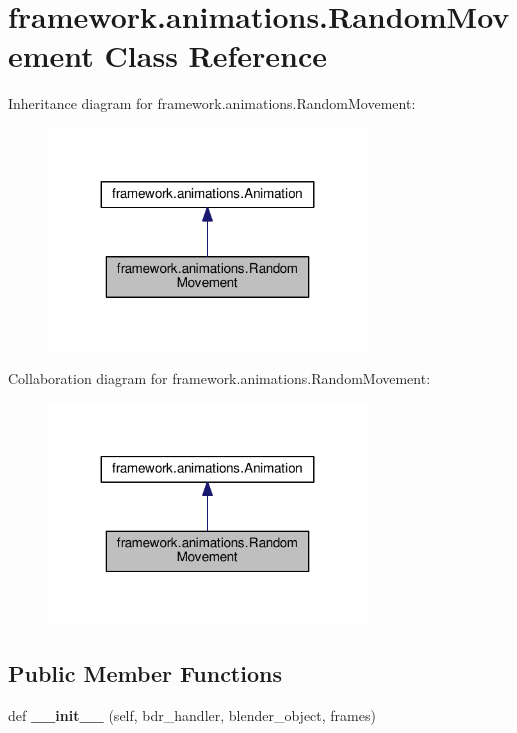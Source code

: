 \hypertarget{classframework_1_1animations_1_1RandomMovement}{}\section{framework.\+animations.\+Random\+Movement Class Reference}
\label{classframework_1_1animations_1_1RandomMovement}


Inheritance diagram for framework.\+animations.\+Random\+Movement\+:
\nopagebreak
\begin{figure}[H]
\begin{center}
\leavevmode
\includegraphics[width=239pt]{classframework_1_1animations_1_1RandomMovement__inherit__graph}
\end{center}
\end{figure}


Collaboration diagram for framework.\+animations.\+Random\+Movement\+:
\nopagebreak
\begin{figure}[H]
\begin{center}
\leavevmode
\includegraphics[width=239pt]{classframework_1_1animations_1_1RandomMovement__coll__graph}
\end{center}
\end{figure}
\subsection*{Public Member Functions}
\begin{DoxyCompactItemize}
\item 
def {\bfseries \+\_\+\+\_\+init\+\_\+\+\_\+} (self, bdr\+\_\+handler, blender\+\_\+object, frames)\hypertarget{classframework_1_1animations_1_1RandomMovement_a8af0da4ac19f03fc9a61063cd92ad7b7}{}\label{classframework_1_1animations_1_1RandomMovement_a8af0da4ac19f03fc9a61063cd92ad7b7}

\end{DoxyCompactItemize}

